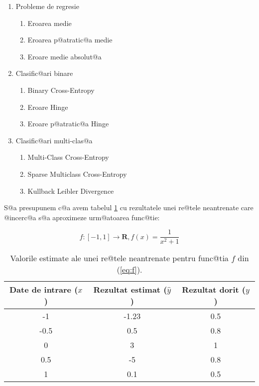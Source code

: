 \begin{enumerate}
	\item Probleme de regresie
	\begin{enumerate}
		\item Eroarea medie
		\item Eroarea p@atratic@a medie
		\item Eroare medie absolut@a
	\end{enumerate}
	\item Clasific@ari binare
	\begin{enumerate}
		\item Binary Cross-Entropy
		\item Eroare Hinge
		\item Eroare p@atratic@a Hinge
	\end{enumerate}
	\item Clasific@ari multi-clas@a
	\begin{enumerate}
		\item Multi-Class Cross-Entropy
		\item Sparse Multiclass Cross-Entropy
		\item Kullback Leibler Divergence
	\end{enumerate}
\end{enumerate}

S@a presupunem c@a avem tabelul \ref{tab:nn-functie} cu rezultatele unei re@tele neantrenate care @incerc@a s@a aproximeze urm@atoarea func@tie:

\begin{equation} \label{eq:f}
	f:[-1, 1]\rightarrow \mathbf{R}, f(x) = \displaystyle\frac{1}{x^2+1}
\end{equation}

\begin{table}[h]
	\begin{center}
		\begin{tabular}{|c|c|c|}
			\hline
			Date de intrare ($x$) & Rezultat estimat ($\hat{y}$) & Rezultat dorit ($y$) \\
			\hline
			-1 & -1.23 & 0.5 \\
			\hline
			-0.5 & 0.5 & 0.8 \\
			\hline
			0 & 3 & 1 \\
			\hline
			0.5 & -5 & 0.8 \\ 
			\hline
			1 & 0.1 & 0.5 \\ 
			\hline
		\end{tabular}
	\end{center}
	\caption{Valorile estimate ale unei re@tele neantrenate pentru func@tia $f$ din (\ref{eq:f}).}
	\label{tab:nn-functie}
\end{table}


